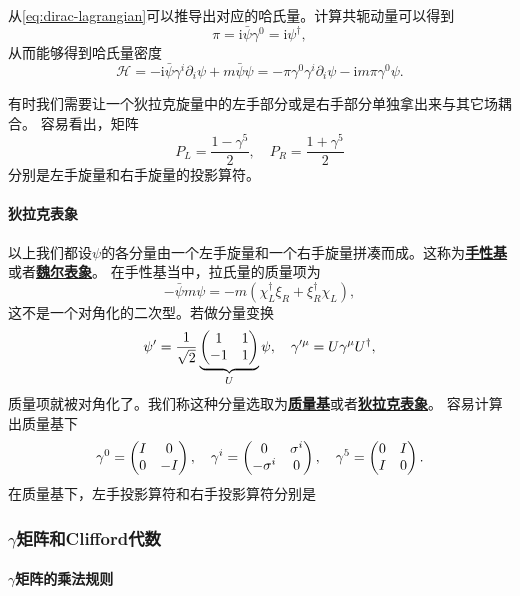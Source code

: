 \documentclass[hyperref, UTF8, a4paper]{ctexart}
\newcommand*{\ii}{\mathrm{i}}
\newcommand{\concept}[1]{\underline{\textbf{#1}}}
\begin{document}
从\eqref{eq:dirac-lagrangian}可以推导出对应的哈氏量。计算共轭动量可以得到
\begin{equation}
    \pi = \ii \bar{\psi} \gamma^0 = \ii \psi^\dagger,
\end{equation}
从而能够得到哈氏量密度
\begin{equation}
    \mathcal{H} = - \ii \bar{\psi} \gamma^i \partial_i \psi  + m \bar{\psi} \psi = - \pi \gamma^0 \gamma^i \partial_i \psi - \ii m \pi \gamma^0 \psi.
    \label{eq:dirac-hamiltonian}
\end{equation}

有时我们需要让一个狄拉克旋量中的左手部分或是右手部分单独拿出来与其它场耦合。
容易看出，矩阵
\begin{equation}
    P_L = \frac{1 - \gamma^5}{2}, \quad P_R = \frac{1 + \gamma^5}{2}
\end{equation}
分别是左手旋量和右手旋量的投影算符。

\paragraph{狄拉克表象} 以上我们都设$\psi$的各分量由一个左手旋量和一个右手旋量拼凑而成。这称为\concept{手性基}或者\concept{魏尔表象}。
在手性基当中，拉氏量的质量项为
\[
    - \bar{\psi} m \psi = - m (\chi_L^\dagger \xi_R + \xi_R^\dagger \chi_L),
\]
这不是一个对角化的二次型。若做分量变换
\begin{equation}
    \psi' = \frac{1}{\sqrt{2}} \underbrace{\pmqty{1 & 1 \\ -1 & 1}}_{U} \psi, \quad \gamma'^\mu = U \gamma^\mu U^\dagger,
\end{equation}
质量项就被对角化了。我们称这种分量选取为\concept{质量基}或者\concept{狄拉克表象}。
容易计算出质量基下
\begin{equation}
    \gamma^0 = \pmqty{I & 0 \\ 0 & -I}, \quad \gamma^i = \pmqty{0 & \sigma^i \\ - \sigma^i & 0 }, \quad \gamma^5 = \pmqty{0 & I \\ I & 0}.
\end{equation}
在质量基下，左手投影算符和右手投影算符分别是

\subsubsection{$\gamma$矩阵和Clifford代数}

\paragraph{$\gamma$矩阵的乘法规则}
\end{document}
